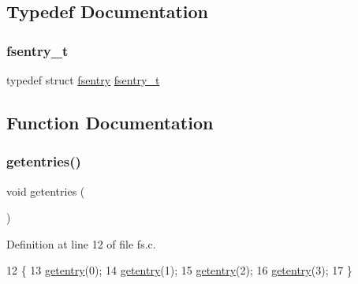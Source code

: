 \subsection{Typedef Documentation}
\mbox{\label{a00152_a9ccf6560e8aebea3e4402a31e8c0f46b_a9ccf6560e8aebea3e4402a31e8c0f46b}} 
\subsubsection{\texorpdfstring{fsentry\+\_\+t}{fsentry\_t}}
{\footnotesize\ttfamily typedef struct \hyperlink{a00272}{fsentry}  \hyperlink{a00152_a9ccf6560e8aebea3e4402a31e8c0f46b_a9ccf6560e8aebea3e4402a31e8c0f46b}{fsentry\+\_\+t}}



\subsection{Function Documentation}
\mbox{\label{a00152_a414110036132977c34813673360e1a63_a414110036132977c34813673360e1a63}} 
\subsubsection{\texorpdfstring{getentries()}{getentries()}}
{\footnotesize\ttfamily void getentries (\begin{DoxyParamCaption}{ }\end{DoxyParamCaption})}



Definition at line 12 of file fs.\+c.


\begin{DoxyCode}
12                   \{
13     \hyperlink{a00149_a3fb32d07d3bd05144a196c94fc59c0d1_a3fb32d07d3bd05144a196c94fc59c0d1}{getentry}(0);
14     \hyperlink{a00149_a3fb32d07d3bd05144a196c94fc59c0d1_a3fb32d07d3bd05144a196c94fc59c0d1}{getentry}(1);
15     \hyperlink{a00149_a3fb32d07d3bd05144a196c94fc59c0d1_a3fb32d07d3bd05144a196c94fc59c0d1}{getentry}(2);
16     \hyperlink{a00149_a3fb32d07d3bd05144a196c94fc59c0d1_a3fb32d07d3bd05144a196c94fc59c0d1}{getentry}(3);
17 \}
\end{DoxyCode}
\mbox{\label{a00152_a3fb32d07d3bd05144a196c94fc59c0d1_a3fb32d07d3bd05144a196c94fc59c0d1}} 
